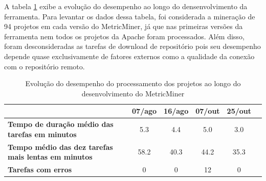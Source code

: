 \documentclass[a4paper, 12pt, twoside]{book}
\begin{document}
        A tabela \ref{tab:evolucao} exibe a evolução do desempenho ao longo do densenvolvimento da ferramenta. Para levantar os dados dessa tabela, foi considerada a mineração de 94 projetos em cada versão do MetricMiner, já que nas primeiras versões da ferramenta nem todos os projetos da Apache foram processados. Além disso, foram desconsideradas as tarefas de download de repositório pois seu desempenho depende quase exclusivamente de fatores externos como a qualidade da conexão com o repositório remoto.

        \begin{table}\begin{center}
        \begin{tabular}{| p{5cm} | c | c | c | c | c | }
            \hline                        
             & \textbf{07/ago} & \textbf{16/ago} & \textbf{07/out} & \textbf{25/out} \\
            \hline
            \textbf{Tempo de duração médio das tarefas em minutos} & 5.3 & 4.4 & 5.0 & 3.0 \\
            \hline
            \textbf{Tempo médio das dez tarefas mais lentas em minutos} & 58.2 & 40.3 & 44.2 & 35.3 \\
            \hline
            \textbf{Tarefas com erros} & 0 & 0 & 12 & 0 \\
            \hline
        \end{tabular}
        \caption{Evolução do desempenho do processamento dos projetos ao longo do desenvolvimento do MetricMiner \label{tab:evolucao}}
        \end{center}\end{table}
\end{document}
